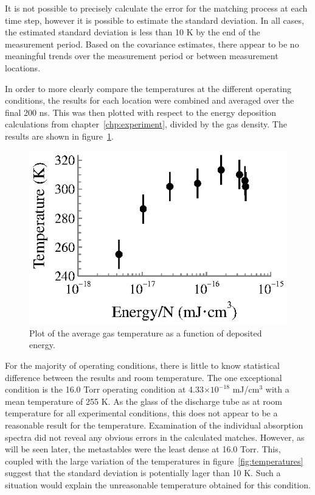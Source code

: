 It is not possible to precisely calculate the error for the matching process at
each time step, however it is possible to estimate the standard deviation. In
all cases, the estimated standard deviation is less than 10 K by the end of the
measurement period. Based on the covariance estimates, there appear to be no
meaningful trends over the measurement period or between measurement locations.

In order to more clearly compare the temperatures at the different operating
conditions, the results for each location were combined and averaged over the
final 200 ns. This was then plotted with respect to the energy deposition
calculations from chapter~\ref{chp:experiment}, divided by the gas density.
The results are shown in figure~\ref{fig:tvp}.
\begin{figure}
  \centering
  \includegraphics{./chapters/metastables/figures/tvp.eps}
  \caption{Plot of the average gas temperature as a function of deposited
  energy.}
  \label{fig:tvp}
\end{figure}
For the majority of operating conditions, there is little to know statistical
difference between the results and room temperature. The one exceptional
condition is the 16.0 Torr operating condition at 4.33$\times10^{-18}$
mJ/cm$^3$ with a mean temperature of 255 K. As the glass of the discharge tube
as at room temperature for all experimental conditions, this does not appear to
be a reasonable result for the temperature. Examination of the individual
absorption spectra did not reveal any obvious errors in the calculated matches.
However, as will be seen later, the metastables were the least dense at 16.0
Torr. This, coupled with the large variation of the temperatures in
figure~\ref{fig:temperatures} suggest that the standard deviation is potentially
lager than 10 K. Such a situation would explain the unreasonable temperature
obtained for this condition.

